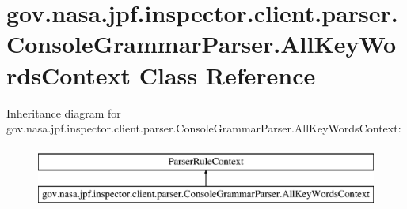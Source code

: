 \hypertarget{classgov_1_1nasa_1_1jpf_1_1inspector_1_1client_1_1parser_1_1_console_grammar_parser_1_1_all_key_words_context}{}\section{gov.\+nasa.\+jpf.\+inspector.\+client.\+parser.\+Console\+Grammar\+Parser.\+All\+Key\+Words\+Context Class Reference}
\label{classgov_1_1nasa_1_1jpf_1_1inspector_1_1client_1_1parser_1_1_console_grammar_parser_1_1_all_key_words_context}
Inheritance diagram for gov.\+nasa.\+jpf.\+inspector.\+client.\+parser.\+Console\+Grammar\+Parser.\+All\+Key\+Words\+Context\+:\begin{figure}[H]
\begin{center}
\leavevmode
\includegraphics[height=2.000000cm]{classgov_1_1nasa_1_1jpf_1_1inspector_1_1client_1_1parser_1_1_console_grammar_parser_1_1_all_key_words_context}
\end{center}
\end{figure}
